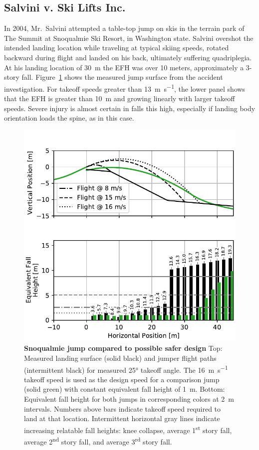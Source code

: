 \documentclass[smallextended]{svjour3}       %
\begin{document}
\subsection{Salvini v. Ski Lifts Inc.}
\label{sec:salvini}
%
In 2004, Mr.~Salvini attempted a table-top jump on skis in the terrain park of
The Summit at Snoqualmie Ski Resort, in Washington state. Salvini overshot the
intended landing location while traveling at typical skiing speeds, rotated
backward during flight and landed on his back, ultimately suffering
quadriplegia. At his landing location of 30~\si{\meter} the EFH was over 10
meters, approximately a 3-story fall.  Figure~\ref{fig:salvini-v-snoqualmie}
shows the measured jump surface from the accident investigation.  For takeoff
speeds greater than 13~\si{\meter\per\second}, the lower panel shows that the
EFH is greater than 10~\si{\meter} and growing linearly with larger takeoff
speeds. Severe injury is almost certain in falls this high, especially if
landing body orientation loads the spine, as in this case.
%
\begin{figure}
  \centering
  \includegraphics[width=\columnwidth]{figures/salvini-v-snoqualmie.pdf}
  \caption{\textbf{Snoqualmie jump compared to possible safer design}
  Top: Measured landing surface (solid black) and jumper flight paths
  (intermittent black) for measured 25\si{\degree} takeoff angle. The
  16~\si{\meter\per\second} takeoff speed is used as the design speed for a
  comparison jump (solid green) with constant equivalent fall height of
  1~\si{\meter}.
  Bottom: Equivalent fall height for both jumps in corresponding colors at
  2~\si{\meter} intervals. Numbers above bars indicate takeoff speed required
  to land at that location.
  Intermittent horizontal gray lines indicate increasing relatable fall
  heights: knee collapse, average 1\textsuperscript{st} story fall, average
  2\textsuperscript{nd} story fall, and average 3\textsuperscript{rd} story
  fall.
  }
  \label{fig:salvini-v-snoqualmie}
\end{figure}
\end{document}
